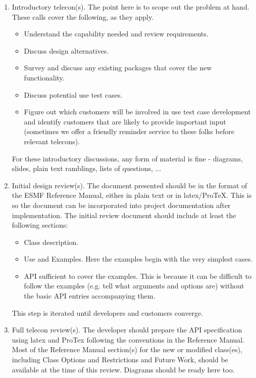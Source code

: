 \begin{enumerate}
\item Introductory telecon(s). The point here is to scope out the problem
at hand. These calls cover the following, as they apply.
\begin{itemize}
\item Understand the capability needed and review requirements.
\item Discuss design alternatives.
\item Survey and discuss any existing packages that cover the new functionality.
\item Discuss potential use test cases.
\item Figure out which customers will be involved in use test case development and identify customers that are likely to provide important input
(sometimes we offer a friendly reminder service to these folks before relevant
telecons).
\end{itemize}

For these introductory discussions, any form of material is fine - diagrams,
slides, plain text ramblings, lists of questions, ...

\item Initial design review(s). The document presented should be in the format
of the ESMF Reference Manual, either in plain text or in latex/ProTeX.
This is so the document can be incorporated into project documentation
after implementation. The initial review document should include at least
the following sections:
\begin{itemize}
\item Class description.
\item Use and Examples. Here the examples begin with the very simplest
cases.
\item API sufficient to cover the examples. This is because it can be difficult
to follow the examples (e.g. tell what arguments and options are) without the
basic API entries accompanying them.
\end{itemize}

This step is iterated until developers and customers converge.

\item Full telecon review(s). The developer should prepare the API specification
using latex and ProTex following the conventions in the Reference Manual.
Most of the Reference Manual section(s) for the new or modified class(es),
including Class Options and Restrictions and Future Work, should be available
at the time of this review. Diagrams should be ready here too.


\end{enumerate}
